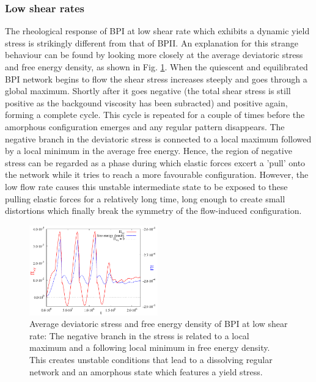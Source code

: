 \documentclass[aps,pre,reprint,superscriptaddress, twocolumn]{revtex4}
\begin{document}
\subsubsection{Low shear rates}

The rheological response of BPI at low shear rate which exhibits a
dynamic yield stress is strikingly different from that of BPII.
An explanation for this strange behaviour can be found by 
looking more closely at the average deviatoric stress and 
free energy density, as shown in Fig. \ref{bp1-fe-yield}.
When the quiescent and equilibrated BPI network begins to flow
the shear stress increases steeply and goes through a global maximum.
Shortly after it goes negative (the total shear stress is still
positive as the backgound viscosity has been subracted) and positive
again, forming a complete cycle. 
This cycle is repeated for a couple of times before 
the amorphous configuration emerges and any regular pattern
disappears.
The negative branch in the deviatoric stress is connected
to a local maximum followed by a local minimum in the average free energy.
Hence, the region of negative stress can be 
regarded as a phase during which elastic forces excert a 
'pull' onto the network while it tries to reach a more 
favourable configuration. However, the low flow rate
causes this unstable intermediate state to be exposed to these
pulling elastic forces for a relatively long time, long enough to 
create small distortions which finally break the symmetry of the
flow-induced configuration.

\begin{figure}[htpb]
\includegraphics[width=0.495\textwidth]{stress_fe_yield_bp1.pdf}
\caption{Average deviatoric stress and free energy density of BPI at low shear rate: The negative branch in the stress is related to a local maximum and a following local minimum in free energy density. This creates unstable conditions that lead to a dissolving regular network and an amorphous state which features a yield stress.}
\label{bp1-fe-yield}
\end{figure}
\end{document}
